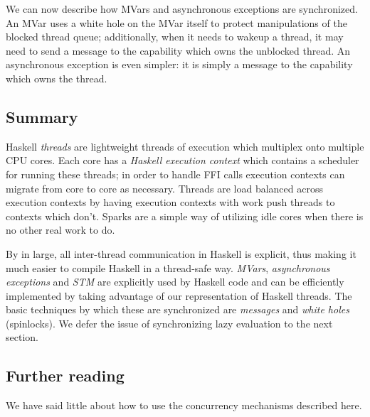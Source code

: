 We can now describe how MVars and asynchronous exceptions are
synchronized.  An MVar uses a white hole on the MVar itself to protect
manipulations of the blocked thread queue; additionally, when it needs
to wakeup a thread, it may need to send a message to the capability
which owns the unblocked thread.  An asynchronous exception is even
simpler: it is simply a message to the capability which owns the thread.

\subsection{Summary}

Haskell \emph{threads} are lightweight threads of execution which
multiplex onto multiple CPU cores.  Each core has a \emph{Haskell
execution context} which contains a scheduler for running these threads;
in order to handle FFI calls execution contexts can migrate from core to
core as necessary.  Threads are load balanced across execution contexts
by having execution contexts with work push threads to contexts which
don't.  Sparks are a simple way of utilizing idle cores when there is no
other real work to do.

By in large, all inter-thread communication in Haskell is explicit, thus
making it much easier to compile Haskell in a thread-safe way.
\emph{MVars}, \emph{asynchronous exceptions} and \emph{STM} are
explicitly used by Haskell code and can be efficiently implemented by
taking advantage of our representation of Haskell threads.  The basic
techniques by which these are synchronized are \emph{messages} and
\emph{white holes} (spinlocks).  We defer the issue of synchronizing
lazy evaluation to the next section.

\subsection{Further reading}

We have said little about how to use the concurrency mechanisms described here. \XXX
